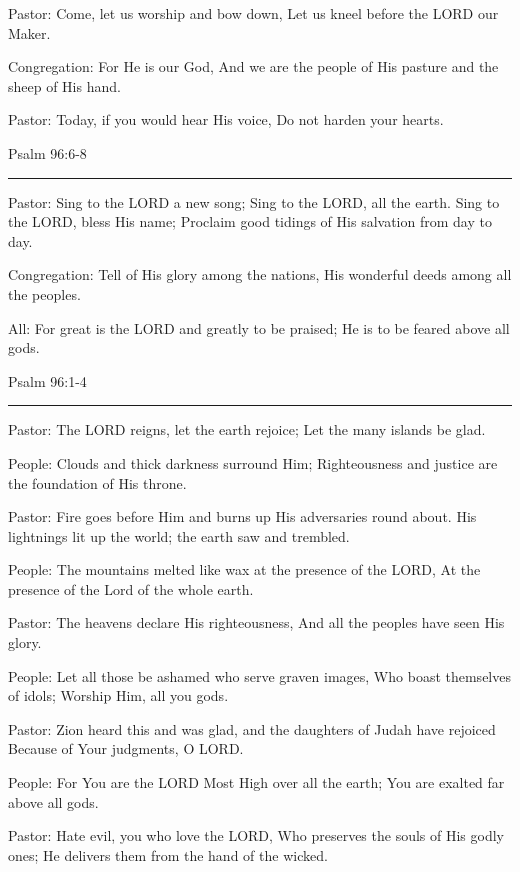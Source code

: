\documentclass[]{book}
\begin{document}
Pastor: Come, let us worship and bow down, Let us kneel before the LORD
our Maker.

Congregation: For He is our God, And we are the people of His pasture
and the sheep of His hand.

Pastor: Today, if you would hear His voice, Do not harden your hearts.

Psalm 96:6-8 \textbar{}

\begin{center}\rule{0.5\linewidth}{\linethickness}\end{center}

Pastor: Sing to the LORD a new song; Sing to the LORD, all the earth.
Sing to the LORD, bless His name; Proclaim good tidings of His salvation
from day to day.

Congregation: Tell of His glory among the nations, His wonderful deeds
among all the peoples.

All: For great is the LORD and greatly to be praised; He is to be feared
above all gods.

Psalm 96:1-4 \textbar{}

\begin{center}\rule{0.5\linewidth}{\linethickness}\end{center}

Pastor: The LORD reigns, let the earth rejoice; Let the many islands be
glad.

People: Clouds and thick darkness surround Him; Righteousness and
justice are the foundation of His throne.

Pastor: Fire goes before Him and burns up His adversaries round about.
His lightnings lit up the world; the earth saw and trembled.

People: The mountains melted like wax at the presence of the LORD, At
the presence of the Lord of the whole earth.

Pastor: The heavens declare His righteousness, And all the peoples have
seen His glory.

People: Let all those be ashamed who serve graven images, Who boast
themselves of idols; Worship Him, all you gods.

Pastor: Zion heard this and was glad, and the daughters of Judah have
rejoiced Because of Your judgments, O LORD.

People: For You are the LORD Most High over all the earth; You are
exalted far above all gods.

Pastor: Hate evil, you who love the LORD, Who preserves the souls of His
godly ones; He delivers them from the hand of the wicked.
\end{document}
